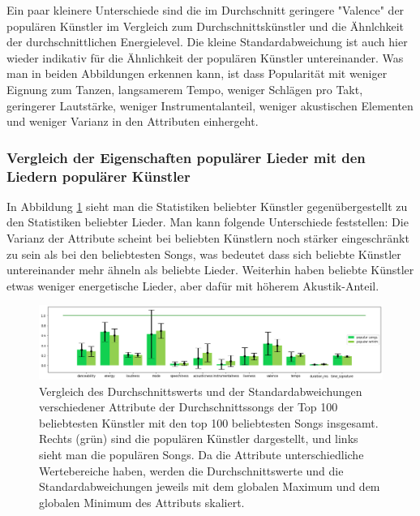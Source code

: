 \documentclass[conference]{IEEEtran}
\begin{document}
Ein paar kleinere Unterschiede sind die im Durchschnitt geringere "Valence" der populären Künstler im Vergleich zum Durchschnittskünstler und die Ähnlchkeit der durchschnittlichen Energielevel. Die kleine Standardabweichung ist auch hier wieder indikativ für die Ähnlichkeit der populären Künstler untereinander.
Was man in beiden Abbildungen erkennen kann, ist dass Popularität mit weniger Eignung zum Tanzen, langsamerem Tempo, weniger Schlägen pro Takt, geringerer Lautstärke, weniger Instrumentalanteil, weniger akustischen Elementen und weniger Varianz in den Attributen einhergeht.

\subsubsection{Vergleich der Eigenschaften populärer Lieder mit den Liedern populärer Künstler}
In Abbildung \ref{popular artists vs popular songs} sieht man die Statistiken beliebter Künstler gegenübergestellt zu den Statistiken beliebter Lieder. Man kann folgende Unterschiede feststellen: Die Varianz der Attribute scheint bei beliebten Künstlern noch stärker eingeschränkt zu sein als bei den beliebtesten Songs, was bedeutet dass sich beliebte Künstler untereinander mehr ähneln als beliebte Lieder. Weiterhin haben beliebte Künstler etwas weniger energetische Lieder, aber dafür mit höherem Akustik-Anteil.

\begin{figure}[t]
\centering
\includegraphics[width=\textwidth]{images/tracks_arts.png}
\caption{Vergleich des Durchschnittswerts und der Standardabweichungen verschiedener Attribute der Durchschnittssongs der Top 100 beliebtesten Künstler mit den top 100 beliebtesten Songs insgesamt. Rechts (grün) sind die populären Künstler dargestellt, und links sieht man die populären Songs. Da die Attribute unterschiedliche Wertebereiche haben, werden die Durchschnittswerte und die Standardabweichungen jeweils mit dem globalen Maximum und dem globalen Minimum des Attributs skaliert.}
\label{popular artists vs popular songs}
\end{figure}
\end{document}
